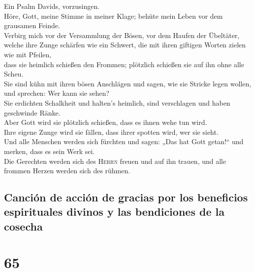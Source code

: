  Ein Psalm Davids, vorzusingen.\\
 Höre, Gott, meine Stimme in meiner Klage; behüte mein
Leben vor dem grausamen Feinde.\\
 Verbirg mich vor der Versammlung der Bösen, vor dem
Haufen der Übeltäter,\\
 welche ihre Zunge schärfen wie ein Schwert, die mit ihren
giftigen Worten zielen wie mit Pfeilen,\\
 dass sie heimlich schießen den Frommen; plötzlich
schießen sie auf ihn ohne alle Scheu.\\
 Sie sind kühn mit ihren bösen Anschlägen und sagen, wie
sie Stricke legen wollen, und sprechen: Wer kann sie sehen?\\
 Sie erdichten Schalkheit und halten's heimlich, sind
verschlagen und haben geschwinde Ränke.\\
 Aber Gott wird sie plötzlich schießen, dass es ihnen wehe
tun wird.\\
 Ihre eigene Zunge wird sie fällen, dass ihrer spotten
wird, wer sie sieht.\\
 Und alle Menschen werden sich fürchten und sagen: „Das
hat Gott getan!{}`` und merken, dass es sein Werk sei.\\
 Die Gerechten werden sich des \textsc{Herrn} freuen und
auf ihn trauen, und alle frommen Herzen werden sich des rühmen.

\hypertarget{canciuxf3n-de-acciuxf3n-de-gracias-por-los-beneficios-espirituales-divinos-y-las-bendiciones-de-la-cosecha}{%
\subsection{Canción de acción de gracias por los beneficios espirituales
divinos y las bendiciones de la
cosecha}\label{canciuxf3n-de-acciuxf3n-de-gracias-por-los-beneficios-espirituales-divinos-y-las-bendiciones-de-la-cosecha}}

\hypertarget{section-64}{%
\section{65}\label{section-64}}

